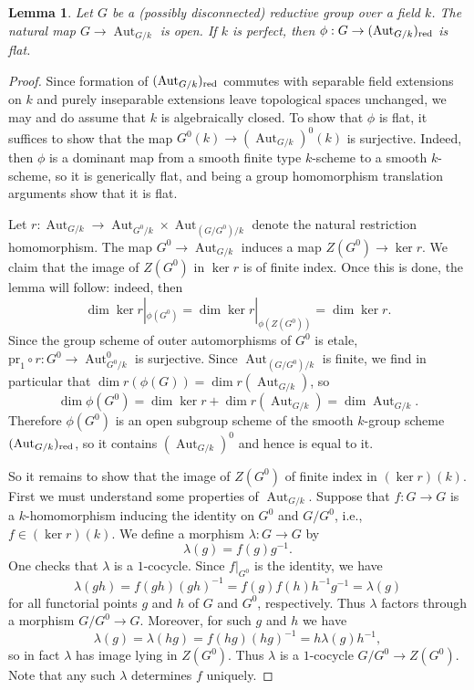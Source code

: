 \documentclass[11pt, letterpaper,english]{amsart}
\theoremstyle{plain}
\newtheorem{lemma}[lem]{Lemma}
\theoremstyle{definition}
\numberwithin{equation}{section}
\numberwithin{lem}{section}
\DeclareMathOperator{\Aut}{Aut}
\begin{document}
\begin{lemma}\label{lemma:inner-open}
Let $G$ be a (possibly disconnected) reductive group over a field $k$. The natural map $G \to \Aut_{G/k}$ is open. If $k$ is perfect, then $\phi: G \to (\Aut_{G/k})_{\rm{red}}$ is flat.
\end{lemma}

\begin{proof}
Since formation of $(\Aut_{G/k})_{\rm{red}}$ commutes with separable field extensions on $k$ and purely inseparable extensions leave topological spaces unchanged, we may and do assume that $k$ is algebraically closed. To show that $\phi$ is flat, it suffices to show that the map $G^0(k) \to (\Aut_{G/k})^0(k)$ is surjective. Indeed, then $\phi$ is a dominant map from a smooth finite type $k$-scheme to a smooth $k$-scheme, so it is generically flat, and being a group homomorphism translation arguments show that it is flat.

Let $r: \Aut_{G/k} \to \Aut_{G^0/k} \times \Aut_{(G/G^0)/k}$ denote the natural restriction homomorphism.  The map $G^0 \to \Aut_{G/k}$ induces a map $Z(G^0) \to \ker r$. We claim that the image of $Z(G^0)$ in $\ker r$ is of finite index. Once this is done, the lemma will follow: indeed, then 
\[
\dim \ker r|_{\phi(G^0)} = \dim \ker r|_{\phi(Z(G^0))} = \dim \ker r.
\]
Since the group scheme of outer automorphisms of $G^0$ is etale, $\mathrm{pr}_1 \circ r: G^0 \to \Aut_{G^0/k}^0$ is surjective. Since $\Aut_{(G/G^0)/k}$ is finite, we find in particular that $\dim r(\phi(G)) = \dim r(\Aut_{G/k})$, so
\[
\dim \phi(G^0) = \dim \ker r + \dim r(\Aut_{G/k}) = \dim \Aut_{G/k}.
\]
Therefore $\phi(G^0)$ is an open subgroup scheme of the smooth $k$-group scheme $(\Aut_{G/k})_{\rm{red}}$, so it contains $(\Aut_{G/k})^0$ and hence is equal to it.  

So it remains to show that the image of $Z(G^0)$ of finite index in $(\ker r)(k)$. First we must understand some properties of $\Aut_{G/k}$. Suppose that $f: G \to G$ is a $k$-homomorphism inducing the identity on $G^0$ and $G/G^0$, i.e., $f \in (\ker r)(k)$. We define a morphism $\lambda: G \to G$ by
\[
\lambda(g) = f(g)g^{-1}.
\]
One checks that $\lambda$ is a $1$-cocycle. Since $f|_{G^0}$ is the identity, we have
\[
\lambda(gh) = f(gh)(gh)^{-1} = f(g)f(h)h^{-1}g^{-1} = \lambda(g)
\]
for all functorial points $g$ and $h$ of $G$ and $G^0$, respectively. Thus $\lambda$ factors through a morphism $G/G^0 \to G$. Moreover, for such $g$ and $h$ we have
\[
\lambda(g) = \lambda(hg) = f(hg)(hg)^{-1} = h\lambda(g)h^{-1},
\]
so in fact $\lambda$ has image lying in $Z(G^0)$. Thus $\lambda$ is a $1$-cocycle $G/G^0 \to Z(G^0)$. Note that any such $\lambda$ determines $f$ uniquely.


\end{proof}
\end{document}
